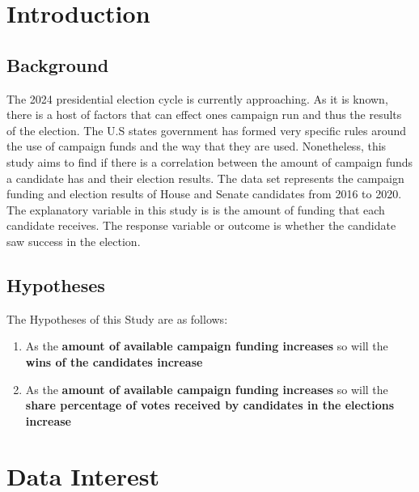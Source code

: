 \documentclass[
]{article}
\providecommand{\tightlist}{%
  \setlength{\itemsep}{0pt}\setlength{\parskip}{0pt}}
\begin{document}
\hypertarget{introduction}{%
\section{Introduction}\label{introduction}}

\hypertarget{background}{%
\subsection{\texorpdfstring{\textbf{Background}}{Background}}\label{background}}

The 2024 presidential election cycle is currently approaching. As it is
known, there is a host of factors that can effect ones campaign run and
thus the results of the election. The U.S states government has formed
very specific rules around the use of campaign funds and the way that
they are used. Nonetheless, this study aims to find if there is a
correlation between the amount of campaign funds a candidate has and
their election results. The data set represents the campaign funding and
election results of House and Senate candidates from 2016 to 2020. The
explanatory variable in this study is is the amount of funding that each
candidate receives. The response variable or outcome is whether the
candidate saw success in the election.

\hypertarget{hypotheses}{%
\subsection{\texorpdfstring{\textbf{Hypotheses}}{Hypotheses}}\label{hypotheses}}

The Hypotheses of this Study are as follows:

\begin{enumerate}
\def\labelenumi{\arabic{enumi})}
\tightlist
\item
  As the \textbf{amount of available campaign funding increases} so will
  the \textbf{wins of the candidates increase}
\item
  As the \textbf{amount of available campaign funding increases} so will
  the \textbf{share percentage of votes received by candidates in the
  elections increase}
\end{enumerate}

\hypertarget{sec-running-code}{%
\section{Data Interest}\label{sec-running-code}}
\end{document}
